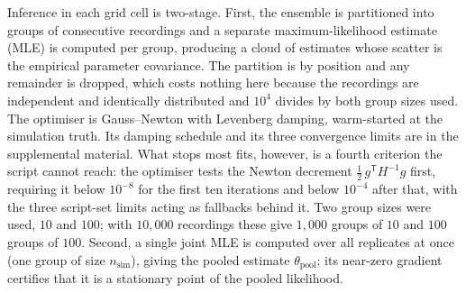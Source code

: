 Inference in each grid cell is two-stage. First, the ensemble is partitioned into
groups of consecutive recordings and a separate maximum-likelihood estimate (MLE) is
computed per group, producing a cloud of estimates whose scatter is the empirical
parameter covariance. The partition is by position and any remainder is dropped,
which costs nothing here because the recordings are independent and identically
distributed and $10^4$ divides by both group sizes used.
The optimiser is Gauss--Newton with Levenberg damping, warm-started at the
simulation truth. Its damping schedule and its three convergence limits are in the supplemental material.
What stops most fits, however, is a fourth criterion the script cannot reach: the optimiser
tests the Newton decrement $\tfrac12\,g^{\mathsf T}H^{-1}g$ first, requiring it below $10^{-8}$
for the first ten iterations and below $10^{-4}$ after that, with the three script-set limits
acting as fallbacks behind it.
Two group sizes were used, $10$ and $100$; with $10{,}000$ recordings these give
$1{,}000$ groups of $10$ and $100$ groups of $100$.
Second, a single joint MLE is computed over all replicates at once (one group of
size $n_{\mathrm{sim}}$), giving the pooled estimate $\theta_{\mathrm{pool}}$; its
near-zero gradient certifies that it is a stationary point of the pooled likelihood.

